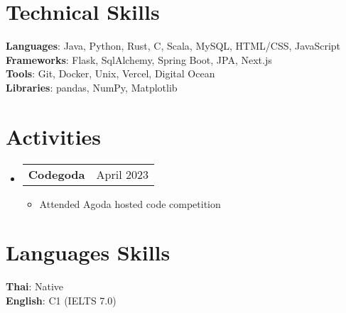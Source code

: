 \documentclass[letterpaper,11pt]{article}
\makeatletter
\newcommand{\resumeItem}[1]{
  \item\small{
    {#1 \vspace{-2pt}}
  }
}
\newcommand{\resumeProjectHeading}[2]{
    \item
    \begin{tabular*}{0.97\textwidth}{l@{\extracolsep{\fill}}r}
      \small#1 & #2 \\
    \end{tabular*}\vspace{-7pt}
}
\newcommand{\resumeSubHeadingListStart}{\begin{itemize}[leftmargin=0.15in, label={}]}
\newcommand{\resumeSubHeadingListEnd}{\end{itemize}}
\newcommand{\resumeItemListStart}{\begin{itemize}}
\newcommand{\resumeItemListEnd}{\end{itemize}\vspace{-5pt}}
\makeatother
\begin{document}
\section{Technical Skills}
 \begin{itemize}[leftmargin=0.15in, label={}]
    \small{\item{
     \textbf{Languages}{: Java, Python, Rust, C, Scala, MySQL, HTML/CSS, JavaScript} \\
     \textbf{Frameworks}{: Flask, SqlAlchemy, Spring Boot, JPA, Next.js} \\
     \textbf{Tools}{: Git, Docker, Unix, Vercel, Digital Ocean} \\
     \textbf{Libraries}{: pandas, NumPy, Matplotlib}
    }}
 \end{itemize}

\section{Activities}
    \resumeSubHeadingListStart
      \resumeProjectHeading
        {\textbf{Codegoda}}{April 2023}
        \resumeItemListStart
          \resumeItem{Attended Agoda hosted code competition}
        \resumeItemListEnd
    \resumeSubHeadingListEnd

\section{Languages Skills}
 \begin{itemize}[leftmargin=0.15in, label={}]
    \small{\item{
     \textbf{Thai}{: Native} \\
     \textbf{English}{: C1 (IELTS 7.0)} \\
    }}
 \end{itemize}


\end{document}
